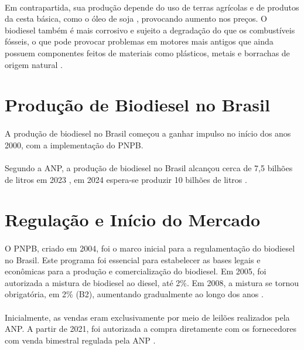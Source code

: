 \paragraph{} Em contrapartida, sua produção depende do uso de terras agrícolas \cite{totalenergies_biodiesel} e de produtos da cesta básica, como o óleo de soja \cite{infomoney_cesta_basica}, provocando aumento nos preços. O biodiesel também é mais corrosivo e sujeito a degradação do que os combustíveis fósseis, o que pode provocar problemas em motores mais antigos que ainda possuem componentes feitos de materiais como plásticos, metais e borrachas de origem natural \cite{totalenergies_biodiesel}.

\section{Produção de Biodiesel no Brasil}

\paragraph{}A produção de biodiesel no Brasil começou a ganhar impulso no início dos anos 2000, com a implementação do \ac{PNPB}.

\paragraph{}Segundo a \ac{ANP}, a produção de biodiesel no Brasil alcançou cerca de 7,5 bilhões de litros em 2023 \cite{ANPBoletim12_2023}, em 2024 espera-se produzir 10 bilhões de litros \cite{ANPBoletim01_2024}.

\section{Regulação e Início do Mercado}

\paragraph{} O \ac{PNPB}, criado em 2004, foi o marco inicial para a regulamentação do biodiesel no Brasil. Este programa foi essencial para estabelecer as bases legais e econômicas para a produção e comercialização do biodiesel. Em 2005, foi autorizada a mistura de biodiesel ao diesel, até 2\%. Em 2008, a mistura se tornou obrigatória, em 2\% (B2), aumentando gradualmente ao longo dos anos \cite{biodiesel_def_anp}.
\paragraph{} Inicialmente, as vendas eram exclusivamente por meio de leilões realizados pela \ac{ANP}. A partir de 2021, foi autorizada a compra diretamente com os fornecedores com venda bimestral regulada pela \ac{ANP} \cite{epbr2021}.

